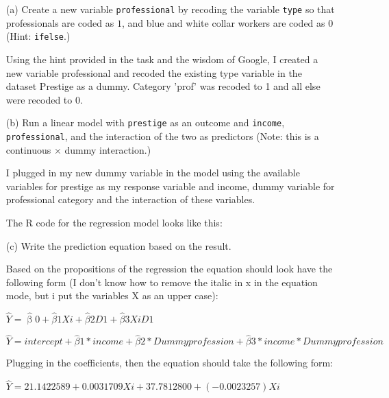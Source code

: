 \documentclass[12pt,letterpaper]{article}
\begin{document}
\newpage
\begin{enumerate}
	
	\item [(a)]
	Create a new variable \texttt{professional} by recoding the variable \texttt{type} so that professionals are coded as $1$, and blue and white collar workers are coded as $0$ (Hint: \texttt{ifelse}.)
	
	Using the hint provided in the task and the wisdom of Google, I created a new variable professional and recoded the existing type variable in the dataset Prestige as a dummy. Category 'prof' was recoded to 1 and all else were recoded to 0.   
	
	
	
	\vspace{1cm}
	
	
	\item [(b)]
	Run a linear model with \texttt{prestige} as an outcome and \texttt{income}, \texttt{professional}, and the interaction of the two as predictors (Note: this is a continuous $\times$ dummy interaction.)
	
	I plugged in my new dummy variable in the model using the available variables for prestige as my response variable and income, dummy variable for professional category and the interaction of these variables. 
	
	The R code for the regression model looks like this:
	
	  
	
	\vspace{1cm}
	\item [(c)]
	Write the prediction equation based on the result.
	
	Based on the propositions of the regression the equation should look have the following form (I don't know how to remove the italic in x in the equation mode, but i put the variables X as an upper case): 
	
	$\hat{Y} = \hat{\upbeta}0 + \hat{\beta}1Xi + \hat{\beta}2D1 + \hat{\beta}3XiD1$ 
	
	$\hat{Y} = intercept + \hat{\beta}1*income + \hat{\beta}2*Dummyprofession + \hat{\beta}3*income*Dummyprofession$
	
	Plugging in the coefficients, then the equation should take the following form:
	
	$\hat{Y} = 21.1422589 + 0.0031709Xi + 37.7812800 + (-0.0023257)Xi$
	

\end{enumerate}
\end{document}
